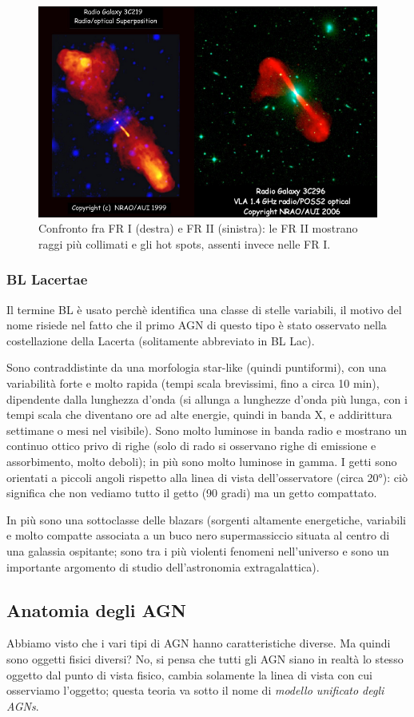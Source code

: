 \begin{figure}
    \centering
    \includegraphics[width = 0.6 \textwidth]{immagini/galassie-radio.png}
    \caption{Confronto fra FR I (destra) e FR II (sinistra): le FR II mostrano raggi più collimati e gli hot spots, assenti invece nelle FR I.}
    \label{fig:galassie-radio}
\end{figure}

\subsubsection{BL Lacertae} 
Il termine BL è usato perchè identifica una classe di stelle variabili, il motivo del nome risiede nel fatto che il primo AGN di questo tipo è stato osservato nella costellazione della Lacerta (solitamente abbreviato in BL Lac). 

Sono contraddistinte da una morfologia star-like (quindi puntiformi), con una variabilità forte e molto rapida (tempi scala brevissimi, fino a circa 10 min), dipendente dalla lunghezza d’onda (si allunga a lunghezze d’onda più lunga, con i tempi scala che diventano ore ad alte energie, quindi in banda X, e addirittura settimane o mesi nel visibile). Sono molto luminose in banda radio e mostrano un continuo ottico privo di righe (solo di rado si osservano righe di emissione e assorbimento, molto deboli); in più sono molto luminose in gamma. I getti sono orientati a piccoli angoli rispetto alla linea di vista dell’osservatore (circa 20°): ciò significa che non vediamo tutto il getto (90 gradi) ma un getto compattato.

In più sono una sottoclasse delle blazars (sorgenti altamente energetiche, variabili e molto compatte associata a un buco nero supermassiccio situata al centro di una galassia ospitante; sono tra i più violenti fenomeni nell'universo e sono un importante argomento di studio dell'astronomia extragalattica).

\subsection{Anatomia degli AGN}
Abbiamo visto che i vari tipi di AGN hanno caratteristiche diverse. Ma quindi sono oggetti fisici diversi? No, si pensa che tutti gli AGN siano in realtà lo stesso oggetto dal punto di vista fisico, cambia solamente la linea di vista con cui osserviamo l’oggetto; questa teoria va sotto il nome di \emph{modello unificato degli AGNs}.

